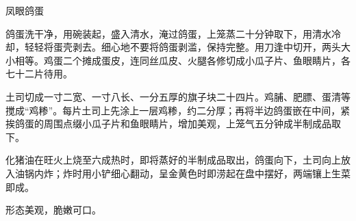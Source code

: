 \begin{recipe}{凤眼鸽蛋}

\ingredients


\cooking

\step 鸽蛋洗干净，用碗装起，盛入清水，淹过鸽蛋，上笼蒸二十分钟取下，用清水冷却，轻轻将蛋壳剥去。细心地不要将鸽蛋剥滥，保持完整。用刀逢中切开，两头大小相等。鸡蛋二个摊成蛋皮，连同丝瓜皮、火腿各修切成小瓜子片、鱼眼睛片，各七十二片待用。

\step 土司切成一寸二宽、一寸八长、一分五厚的旗子块二十四片。鸡脯、肥膘、蛋清等搅成“鸡糁”。每片土司上先涂上一层鸡糁，约二分厚；再将半边鸽蛋嵌在中间，紧挨鸽蛋的周围点缀小瓜子片和鱼眼睛片，增加美观，上笼气五分钟成半制成品取下。

\step 化猪油在旺火上烧至六成热时，即将蒸好的半制成品取出，鸽蛋向下，土司向上放入油锅内炸；炸时用小铲细心翻动，呈金黄色时即涝起在盘中摆好，两端镶上生菜即成。

\notes

形态美观，脆嫩可口。

\end{recipe}

